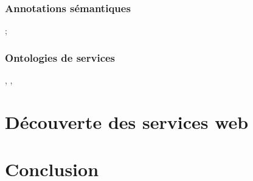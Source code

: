 	\subsubsection{Annotations sémantiques};
	\subsubsection{Ontologies de services} 
	  \cite{ankolekar2002daml}, \cite{mcguinness2004owl} , \cite{mcilraith2003bringing}

\section{Découverte des services web}


\section{Conclusion}
